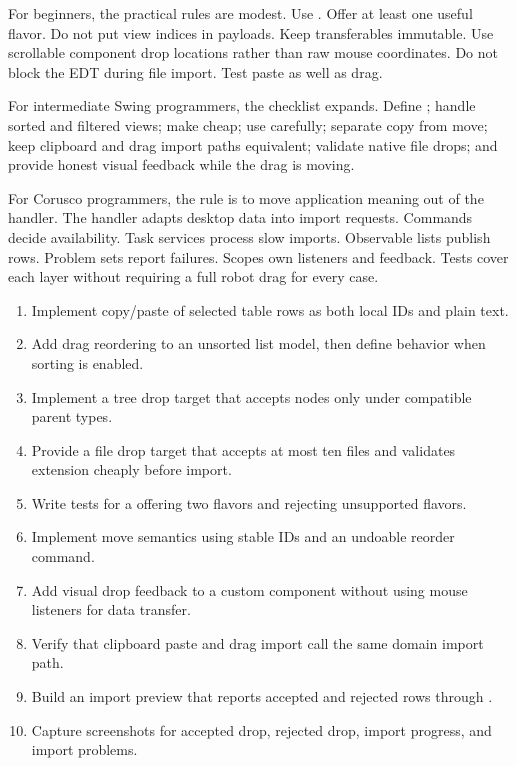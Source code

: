 For beginners, the practical rules are modest. Use . Offer at least one useful flavor. Do not put view indices in payloads. Keep transferables immutable. Use scrollable component drop locations rather than raw mouse coordinates. Do not block the EDT during file import. Test paste as well as drag.

For intermediate Swing programmers, the checklist expands. Define ; handle sorted and filtered views; make  cheap; use  carefully; separate copy from move; keep clipboard and drag import paths equivalent; validate native file drops; and provide honest visual feedback while the drag is moving.

For Corusco programmers, the rule is to move application meaning out of the handler. The handler adapts desktop data into import requests. Commands decide availability. Task services process slow imports. Observable lists publish rows. Problem sets report failures. Scopes own listeners and feedback. Tests cover each layer without requiring a full robot drag for every case.

\begin{exercisebox}
\begin{enumerate}
\item Implement copy/paste of selected table rows as both local IDs and plain text.
\item Add drag reordering to an unsorted list model, then define behavior when sorting is enabled.
\item Implement a tree drop target that accepts nodes only under compatible parent types.
\item Provide a file drop target that accepts at most ten files and validates extension cheaply before import.
\item Write tests for a  offering two flavors and rejecting unsupported flavors.
\item Implement move semantics using stable IDs and an undoable reorder command.
\item Add visual drop feedback to a custom component without using mouse listeners for data transfer.
\item Verify that clipboard paste and drag import call the same domain import path.
\item Build an import preview that reports accepted and rejected rows through .
\item Capture screenshots for accepted drop, rejected drop, import progress, and import problems.
\end{enumerate}
\end{exercisebox}

